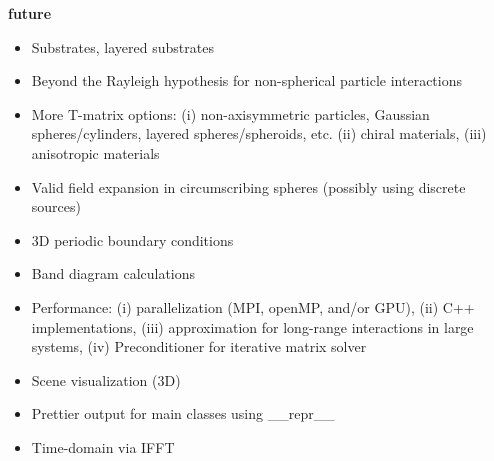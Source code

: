 \documentclass[11pt]{article}
\begin{document}
\begin{enumerate*}
\begin{itemize}[label={\tiny\raisebox{1ex}{\textbullet}}]
        \end{itemize}
    \item \textbf{future}
        \begin{itemize}[label={\tiny\raisebox{1ex}{\textbullet}}]
            \item Substrates, layered substrates
            \item Beyond the Rayleigh hypothesis for non-spherical particle interactions
            \item More T-matrix options:
                        (i) non-axisymmetric particles, Gaussian spheres/cylinders, layered spheres/spheroids, etc.
                        (ii) chiral materials,
                        (iii) anisotropic materials
                    \item Valid field expansion in circumscribing spheres (possibly using discrete sources)
            \item 3D periodic boundary conditions
            \item Band diagram calculations
            \item Performance:
                      (i) parallelization (MPI, openMP, and/or GPU),
                      (ii) C++ implementations,
                      (iii) approximation for long-range interactions in large systems,
                      (iv) Preconditioner for iterative matrix solver
            \item Scene visualization (3D)
            \item Prettier output for main classes using \_\_repr\_\_
            \item Time-domain via IFFT
        \end{itemize}
\end{enumerate*}



{}
\end{document}
